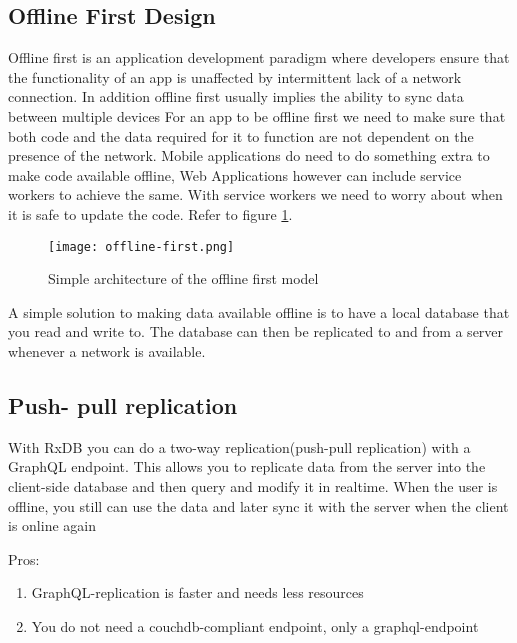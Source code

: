 \subsection{Offline First Design}

Offline first is an application development paradigm where developers ensure that the functionality of an app is unaffected by intermittent lack of a network connection. In addition offline first usually implies the ability to sync data between multiple devices
For an app to be offline first we need to make sure that both code and the data required for it to function are not dependent on the presence of the network.
Mobile applications do need to do something extra to make code available offline,
Web Applications however can include service workers to achieve the same.
With service workers we need to worry about when it is safe to update the code. Refer to figure \ref{fig:offline-first}.

\begin{figure}[h!]
    \begin{center}
        \texttt{[image: offline-first.png]}
    \end{center}
    \caption{Simple architecture of the offline first model}
    \label{fig:offline-first}
\end{figure}

A simple solution to making data available offline is to have a local database that you read and write to. The database can then be replicated to and from a server whenever a network is available.


\subsection{Push- pull replication}

With RxDB you can do a two-way replication(push-pull replication) with a GraphQL endpoint. This allows you to replicate data from the server into the client-side database and then query and modify it in realtime.
When the user is offline, you still can use the data and later sync it with the server when the client is online again

Pros:
\begin{enumerate}
    \item GraphQL-replication is faster and needs less resources
    \item You do not need a couchdb-compliant endpoint, only a graphql-endpoint
\end{enumerate}

